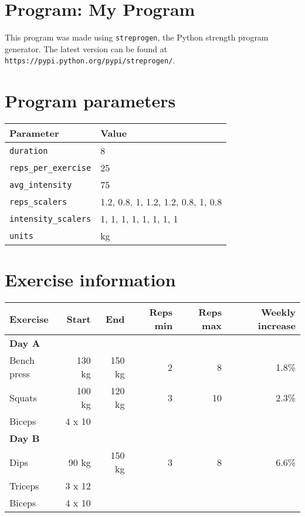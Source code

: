 \documentclass[12pt, a4paper]{article}%
\begin{document}
\large

\section*{Program: My Program}

This program was made using \verb|streprogen|,
the Python strength program generator.
The latest version can be found at \\
\verb|https://pypi.python.org/pypi/streprogen/|.


\section*{Program parameters}
\begin{tabular}{l|l}
	\textbf{Parameter} & \textbf{Value} \\ \hline
	\verb|duration|             & 8 \\
	\verb|reps_per_exercise|    & 25 \\
	\verb|avg_intensity|        & 75 \\
	\verb|reps_scalers|         & 1.2, 0.8, 1, 1.2, 1.2, 0.8, 1, 0.8 \\
	\verb|intensity_scalers|    & 1, 1, 1, 1, 1, 1, 1, 1 \\
	\verb|units|                & kg
\end{tabular}




\section*{Exercise information}
\begin{tabular}{lrrrrr}
    \textbf{Exercise} & \textbf{Start} & \textbf{End} & \textbf{Reps min}
    & \textbf{Reps max} & \textbf{Weekly increase} \\ \hline
      \textbf{ Day A } & & & & & \\ \hline
        \hspace{0.5em}Bench press & 130 kg &
         150 kg & 2 & 8 &
          1.8\%\\
        \hspace{0.5em}Squats & 100 kg &
         120 kg & 3 & 10 &
          2.3\%\\
       \hspace{0.5em}Biceps & 4 x 10 & & & & \\
      \textbf{ Day B } & & & & & \\ \hline
        \hspace{0.5em}Dips & 90 kg &
         150 kg & 3 & 8 &
          6.6\%\\
       \hspace{0.5em}Triceps & 3 x 12 & & & & \\
       \hspace{0.5em}Biceps & 4 x 10 & & & & \\
\hline
\end{tabular}
\end{document}
